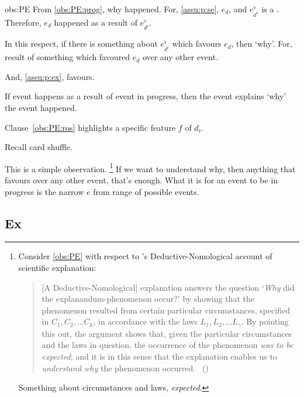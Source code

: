 \begin{note}
\begin{motivation}{obs:PE}
    From \ref{obs:PE:prog}, why happened.
    For, \autoref{assu:p:se}, \(e_{d}\), and \(e^{\flat}_{d^{\flat}}\) is a \se{}.
    Therefore, \(e_{d}\) happened as a result of \(e^{\flat}_{d^{\flat}}\).

    In this respect, if there is something about \(e^{\flat}_{d^{\flat}}\) which favours \(e_{d}\), then `why'.
    For, result of something which favoured \(e_{d}\) over any other event.

    And, \autoref{assu:p:ex}, favours.

    If event happens as a result of event in progress, then the event explains `why' the event happened.

    Clause~\ref{obs:PE:ros} highlights a specific feature \(f\) of \(d_{\flat}\).
  \end{motivation}

  {
    \color{red}
    Recall card shuffle.
  }

  This is a simple observation.%
  \footnote{
    Consider \autoref{obs:PE} with respect to \citeauthor{Hempel:1965aa}'s Deductive-Nomological account of scientific explanation:

    \begin{quote}
      [A Deductive-Nomological] explanation answers the question
      `\emph{Why} did the explanandum-phenomenon occur?'
      by showing that the phenomenon resulted from certain particular circumstances, specified in \(C_{1}, C_{2}, \dots C_{k}\), in accordance with the laws \(L_{1}, L_{2}, \dots L_{\gamma}\).
      By pointing this out, the argument shows that, given the particular circumstances and the laws in question, the occurrence of the phenomenon \emph{was to be expected}; and it is in this sense that the explanation enables us to \emph{understand why} the phenomenon occurred.%
      \mbox{ }\hfill\mbox{(\citeyear[337]{Hempel:1965aa})}
    \end{quote}

    Something about circumstances and laws, \emph{expected}.
  }
  If we want to understand why, then anything that favours over any other event, that's enough.
  What it is for an event to be in progress is the narrow \(e\) from range of possible events.
\end{note}



\subsection{Ex}

